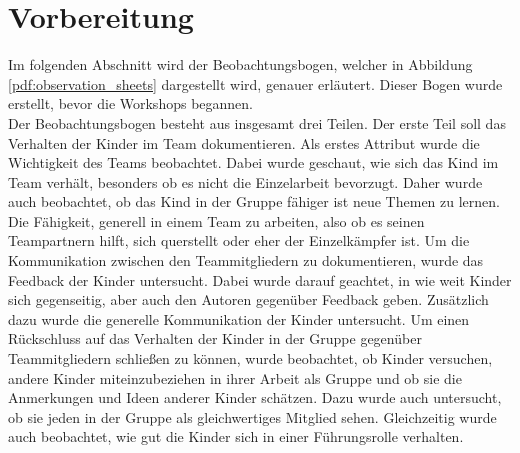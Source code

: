 \section{Vorbereitung}
	Im folgenden Abschnitt wird der Beobachtungsbogen, welcher in Abbildung \ref{pdf:observation_sheets} dargestellt wird, genauer erläutert. Dieser Bogen wurde erstellt, bevor die Workshops begannen.\\
	Der Beobachtungsbogen besteht aus insgesamt drei Teilen. Der erste Teil soll das Verhalten der Kinder im Team dokumentieren. Als erstes Attribut wurde die Wichtigkeit des Teams beobachtet. Dabei wurde geschaut, wie sich das Kind im Team verhält, besonders ob es nicht die Einzelarbeit bevorzugt. Daher wurde auch beobachtet, ob das Kind in der Gruppe fähiger ist neue Themen zu lernen. Die Fähigkeit, generell in einem Team zu arbeiten, also ob es seinen Teampartnern hilft, sich querstellt oder eher der Einzelkämpfer ist. Um die Kommunikation zwischen den Teammitgliedern zu dokumentieren, wurde das Feedback der Kinder untersucht. Dabei wurde darauf geachtet, in wie weit Kinder sich gegenseitig, aber auch den Autoren gegenüber Feedback geben. Zusätzlich dazu wurde die generelle Kommunikation der Kinder untersucht. Um einen Rückschluss auf das Verhalten der Kinder in der Gruppe gegenüber Teammitgliedern schließen zu können, wurde beobachtet, ob Kinder versuchen, andere Kinder miteinzubeziehen in ihrer Arbeit als Gruppe und ob sie die Anmerkungen und Ideen anderer Kinder schätzen. Dazu wurde auch untersucht, ob sie jeden in der Gruppe als gleichwertiges Mitglied sehen. Gleichzeitig wurde auch beobachtet, wie gut die Kinder sich in einer Führungsrolle verhalten.
	
